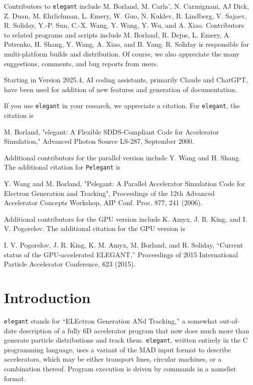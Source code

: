 \documentclass[11pt]{article}
\begin{document}
Contributors to {\tt elegant} include M. Borland, M. Carla', N. Carmignani, AJ Dick, Z. Duan, M. Ehrlichman, L. Emery, W. Guo, 
N. Kuklev, R. Lindberg, V. Sajaev, R. Soliday, Y.-P. Sun, C.-X. Wang, Y. Wang, Y. Wu, and A. Xiao.
Contributors to related programs and scripts include M. Borland, R. Dejus, L. Emery, A. Petrenko, H. Shang, Y. Wang, 
A. Xiao, and B. Yang.
R. Soliday is responsible for multi-platform builds and distribution.
Of course, we also appreciate the many suggestions, comments, and bug reports from users.

Starting in Version 2025.4, AI coding assistants, primarily Claude and ChatGPT, have been used for addition of new
features and generation of documentation.

If you use {\tt elegant} in your research, we appreciate a citation. For {\tt elegant}, the citation is
\begin{flushleft}
M. Borland, "elegant: A Flexible SDDS-Compliant Code for Accelerator Simulation," Advanced Photon Source LS-287, September 2000.
\end{flushleft}

Additional contributors for the parallel version include Y. Wang and H. Shang.
The additional citation for {\tt Pelegant} is
\begin{flushleft}
Y. Wang and M. Borland, "Pelegant: A Parallel Accelerator Simulation Code for Electron Generation and Tracking", Proceedings of the 12th Advanced Accelerator
Concepts Workshop, AIP Conf. Proc. 877, 241 (2006).
\end{flushleft}

Additional contributors for the GPU version include K. Amyx, J. R. King, and I. V. Pogorelov. 
The additional citation for the GPU version is
\begin{flushleft}
I. V. Pogorelov, J. R. King, K. M. Amyx, M. Borland, and R. Soliday, ``Current status of the GPU-accelerated ELEGANT,''
Proceedings of 2015 International Particle Accelerator Conference, 623 (2015).
\end{flushleft}

\section{Introduction}

{\tt elegant} stands for ``ELEctron Generation ANd Tracking,'' a
somewhat out-of-date description of a fully 6D accelerator program
that now does much more than generate particle distributions and track
them.  {\tt elegant}, written entirely in the C programming
language\cite{Kernighan}, uses a variant of the MAD\cite{MAD} input
format to describe accelerators, which may be either transport lines,
circular machines, or a combination thereof.  Program execution is
driven by commands in a namelist format.
\end{document}
